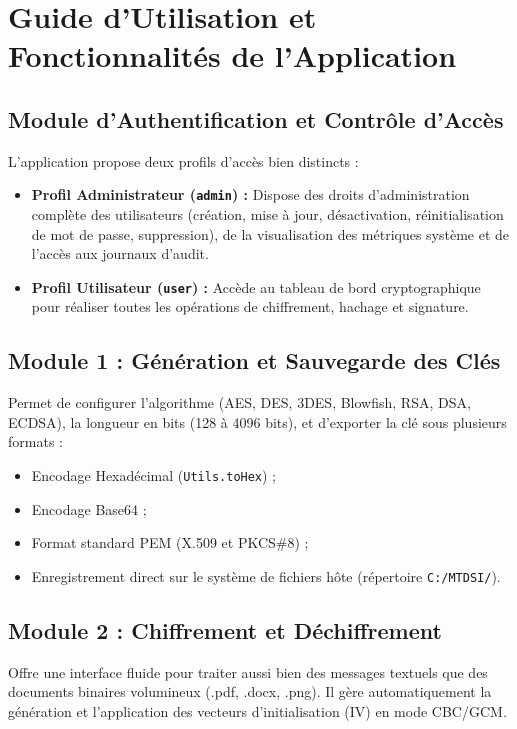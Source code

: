\documentclass[12pt,a4paper]{report}
\begin{document}
\chapter{Guide d'Utilisation et Fonctionnalités de l'Application}

\section{Module d'Authentification et Contrôle d'Accès}
L'application propose deux profils d'accès bien distincts :
\begin{itemize}
    \item \textbf{Profil Administrateur (\texttt{admin}) :} Dispose des droits d'administration complète des utilisateurs (création, mise à jour, désactivation, réinitialisation de mot de passe, suppression), de la visualisation des métriques système et de l'accès aux journaux d'audit.
    \item \textbf{Profil Utilisateur (\texttt{user}) :} Accède au tableau de bord cryptographique pour réaliser toutes les opérations de chiffrement, hachage et signature.
\end{itemize}

\section{Module 1 : Génération et Sauvegarde des Clés}
Permet de configurer l'algorithme (AES, DES, 3DES, Blowfish, RSA, DSA, ECDSA), la longueur en bits (128 à 4096 bits), et d'exporter la clé sous plusieurs formats :
\begin{itemize}
    \item Encodage Hexadécimal (\texttt{Utils.toHex}) ;
    \item Encodage Base64 ;
    \item Format standard PEM (X.509 et PKCS\#8) ;
    \item Enregistrement direct sur le système de fichiers hôte (répertoire \texttt{C:/MTDSI/}).
\end{itemize}

\section{Module 2 : Chiffrement et Déchiffrement}
Offre une interface fluide pour traiter aussi bien des messages textuels que des documents binaires volumineux (.pdf, .docx, .png). Il gère automatiquement la génération et l'application des vecteurs d'initialisation (IV) en mode CBC/GCM.
\end{document}
